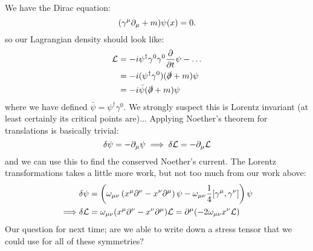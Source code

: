 We have the Dirac equation:
\begin{equation}
    (\gamma^\mu \partial_\mu + m)\psi(x) = 0.
\end{equation}
so our Lagrangian density should look like:
\begin{equation}
    \begin{split}
        \mathcal{L} &= -i\psi^\dagger \gamma^0\gamma^0 \frac{\partial }{\partial t}\psi - \ldots
        \\ &= -i(\psi^\dagger \gamma^0)(\slashed{\partial} + m)\psi
        \\ &= -i\bar{\psi}(\slashed{\partial} + m)\psi 
    \end{split}
\end{equation}
where we have defined $\bar{\psi} = \psi^\dag \gamma^0$. We strongly suspect this is Lorentz invariant (at least certainly its critical points are)... Applying Noether's theorem for translations is basically trivial:
\begin{equation}
    \delta\psi = -\partial_\mu \psi \implies \delta \mathcal{L} = -\partial_\mu \mathcal{L}
\end{equation}
and we can use this to find the conserved Noether's current. The Lorentz transformations takes a little more work, but not too much from our work above:
\begin{equation}
    \begin{split}
        &\delta \psi = \left(\omega_{\mu\nu}\left(x^\mu \partial^\nu - x^\nu \partial^\mu\right)\psi - \omega_{\mu\nu}\frac{1}{4}[\gamma^\mu, \gamma^\nu]\right)\psi
        \\ \implies & \delta \mathcal{L} = \omega_{\mu\nu}(x^\mu\partial^\nu - x^\nu \partial^\mu)\mathcal{L} = \partial^\mu (-2\omega_{\mu\nu}x^\nu \mathcal{L})
    \end{split}
\end{equation}
Our question for next time; are we able to write down a stress tensor that we could use for all of these symmetries?